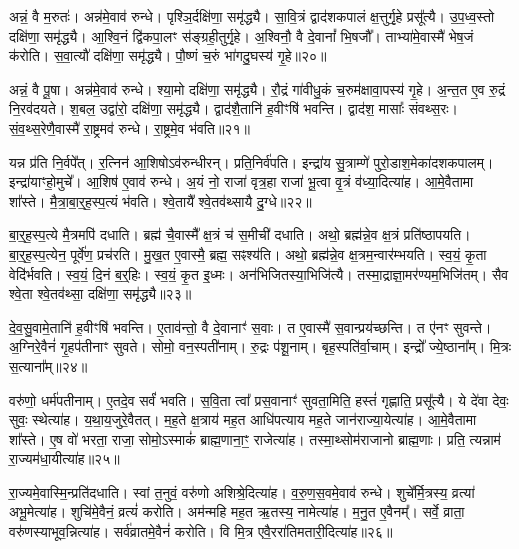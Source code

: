 अन्नं॒ वै म॒रुतः॑।
अन्न॑मे॒वाव॑ रुन्धे।
पृश्ञि॒र्दक्षि॑णा॒ समृ॑द्ध्यै।
सा॒वि॒त्रं द्वाद॑शकपालं क्ष॒त्तुर्गृ॒हे प्रसू᳚त्यै।
उ॒प॒ध्व॒स्तो दक्षि॑णा॒ समृ॑द्ध्यै।
आ॒श्वि॒नं द्वि॑कपा॒लꣳ स॑ङ्ग्रही॒तुर्गृ॒हे।
अ॒श्विनौ॒ वै दे॒वानां᳚ भि॒षजौ᳚।
ताभ्या॑मे॒वास्मै॑ भेष॒जं क॑रोति।
स॒वा॒त्यौ॑ दक्षि॑णा॒ समृ॑द्ध्यै।
पौ॒ष्णं च॒रुं भा॑गदु॒घस्य॑ गृ॒हे॥२०॥\ip

अन्नं॒ वै पू॒षा।
अन्न॑मे॒वाव॑ रुन्धे।
श्या॒मो दक्षि॑णा॒ समृ॑द्ध्यै।
रौ॒द्रं गा॑वीधु॒कं च॒रुम॑क्षावा॒पस्य॑ गृ॒हे।
अ॒न्त॒त ए॒व रु॒द्रं नि॒रव॑दयते।
श॒बल॒ उद्वा॑रो॒ दक्षि॑णा॒ समृ॑द्ध्यै।
द्वाद॑शै॒तानि॑ ह॒वीꣳषि॑ भवन्ति।
द्वाद॑श॒ मासाः᳚ संवथ्स॒रः।
सं॒व॒थ्स॒रेणै॒वास्मै॑ रा॒ष्ट्रमव॑ रुन्धे।
रा॒ष्ट्रमे॒व भ॑वति॥२१॥\ip

यन्न प्र॑ति नि॒र्वपे᳚त्।
र॒त्निन॑ आ॒शिषो\-ऽव॑रुन्धीरन्।
प्रति॒निर्व॑पति।
इन्द्रा॑य सु॒त्राम्णे॑ पुरो॒डाश॒मेका॑\-दश\-कपालम्।
इन्द्रा॑याꣳहो॒मुचे᳚।
आ॒शिष॑ ए॒वाव॑ रुन्धे।
अ॒यं नो॒ राजा॑ वृत्र॒हा राजा॑ भू॒त्वा वृ॒त्रं व॑ध्या॒दित्या॑ह।
आ॒\-मे॒वैतामा शा᳚स्ते।
मै॒त्रा॒बा॒र्॒ह॒स्प॒त्यं भ॑वति।
श्वे॒तायै᳚ श्वे॒तव॑थ्सायै दु॒ग्धे॥२२॥\ip

बा॒र्॒ह॒स्प॒त्ये मै॒त्रमपि॑ दधाति।
ब्रह्म॑ चै॒वास्मै᳚ क्ष॒त्रं च॑ स॒मीची॑ दधाति।
अथो॒ ब्रह्म॑न्ने॒व क्ष॒त्रं प्रति॑\-ष्ठापयति।
बा॒र्॒ह॒स्प॒त्येन॒ पूर्वे॑ण॒ प्रच॑रति।
मु॒ख॒त ए॒वास्मै॒ ब्रह्म॒ सꣴश्य॑ति।
अथो॒ ब्रह्म॑न्ने॒व क्ष॒त्रम॒न्वार॑म्भयति।
स्व॒यं॒ कृ॒ता वेदि॑र्भवति।
स्व॒यं॒ दि॒नं ब॒र्॒हिः।
स्व॒यं॒ कृ॒त इ॒ध्मः।
अन॑भिजितस्या॒भिजि॑त्यै।
तस्मा॒द्राज्ञा॒मर॑ण्यम॒भिजि॑तम्।
सैव श्वे॒ता श्वे॒तव॑थ्सा॒ दक्षि॑णा॒ समृ॑द्ध्यै॥२३॥\ip\anuvakamend[र॒त्नि॒त्वाय॒ समृ॑द्ध्यै पष्ठौ॒ही दक्षि॑णा॒ समृ॑द्ध्यै ग्राम॒ण्यो॑ गृ॒हे भा॑गदु॒घस्य॑ गृ॒हे भ॑वति दु॒ग्धे॑\-ऽभिजि॑त्यै॒ द्वे च॑]

दे॒व॒सु॒वामे॒तानि॑ ह॒वीꣳषि॑ भवन्ति।
ए॒ताव॑न्तो॒ वै दे॒वानाꣳ॑ स॒वाः।
त ए॒वास्मै॑ स॒वान्प्रय॑च्छन्ति।
त ए॑नꣳ सुवन्ते।
अ॒ग्निरे॒वैनं॑ गृ॒हप॑तीनाꣳ सुवते।
सोमो॒ वन॒स्पती॑नाम्।
रु॒द्रः प॑शू॒नाम्।
बृह॒स्पति॑र्वा॒चाम्।
इन्द्रो᳚ ज्ये॒ष्ठाना᳚म्।
मि॒त्रः स॒त्याना᳚म्॥२४॥\ip

वरु॑णो॒ धर्म॑पतीनाम्।
ए॒तदे॒व सर्वं॑ भवति।
स॒वि॒ता त्वा᳚ प्रस॒वानाꣳ॑ सुवता॒मिति॒ हस्तं॑ गृह्णाति॒ प्रसू᳚त्यै।
ये दे॑वा देवः॒ सुवः॒ स्थेत्या॑ह।
य॒था॒\-य॒जु\-रे॒वै\-तत्।
म॒ह॒ते क्ष॒त्राय॑ मह॒त आधि॑पत्याय मह॒ते जान॑राज्या॒येत्या॑ह।
आ॒\-मे॒वैतामा शा᳚स्ते।
ए॒ष वो॑ भरता॒ राजा॒ सोमो॒\-ऽस्माकं॑ ब्राह्म॒णाना॒ꣳ॒ राजेत्या॑ह।
तस्मा॒थ्सोम॑राजानो ब्राह्म॒णाः।
प्रति॒ त्यन्नाम॑ रा॒ज्यम॑धा॒यीत्या॑ह॥२५॥\ip

रा॒ज्यमे॒वास्मि॒न्प्रति॑\-दधाति।
स्वां त॒नुवं॒ वरु॑णो अशिश्रे॒दि\-त्या॑ह।
व॒रु॒ण॒स॒वमे॒वाव॑ रुन्धे।
शुचे᳚र्मि॒त्रस्य॒ व्रत्या॑ अभू॒मेत्या॑ह।
शुचि॑मे॒वैनं॒ व्रत्यं॑ करोति।
अम॑न्महि मह॒त ऋ॒तस्य॒ नामेत्या॑ह।
म॒नु॒त ए॒वैनम्᳚।
सर्वे॒ व्राता॒ वरु॑णस्याभूव॒न्नित्या॑ह।
सर्व॑व्रातमे॒वैनं॑ करोति।
वि मि॒त्र एवै॒ररा॑तिमतारी॒दित्या॑ह॥२६॥\ip

